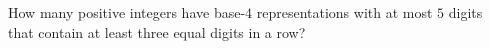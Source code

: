 How many positive integers have base-$4$ representations with at most $5$ digits that contain at least three equal digits in a row?

